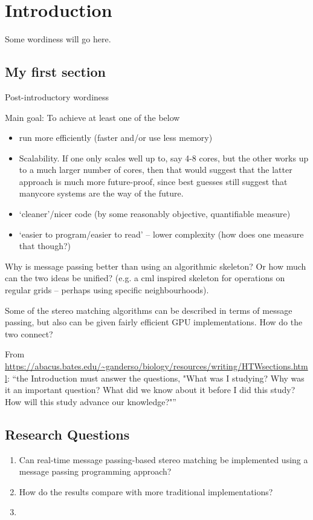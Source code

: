 \chapter{Introduction}
Some wordiness will go here.

\section{My first section}
Post-introductory wordiness

Main goal:  To achieve at least one of the below
\begin{itemize}
\item run more efficiently (faster and/or use less memory)
\item Scalability.  If one only scales well up to, say 4-8 cores, but the other works up to a much larger number of cores, then that would suggest that the latter approach is much more future-proof, since best guesses still suggest that manycore systems are the way of the future.
\item `cleaner'/nicer code (by some reasonably objective, quantifiable measure)
\item `easier to program/easier to read' -- lower complexity (how does one measure that though?)
\end{itemize}

Why is message passing better than using an algorithmic skeleton?  Or how much can the two ideas be unified?  (e.g. a \gls{cml} inspired skeleton for operations on regular grids -- perhaps using specific neighbourhoods).

Some of the stereo matching algorithms can be described in terms of message passing, but also can be given fairly efficient GPU implementations.  How do the two connect?

From \url{https://abacus.bates.edu/~ganderso/biology/resources/writing/HTWsections.html}:  ``the Introduction must answer the questions, "What was I studying? Why was it an important question? What did we know about it before I did this study? How will this study advance our knowledge?"''

\section{Research Questions}
\begin{enumerate}
    \item Can real-time message passing-based stereo matching be implemented using a message passing programming approach?
    \item How do the results compare with more traditional implementations?
    \item 
\end{enumerate}


